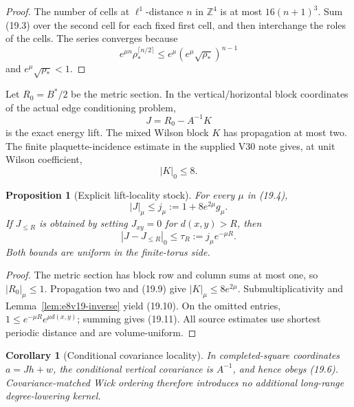 \documentclass[11pt,oneside]{book}
\newtheorem{proposition}[theorem]{Proposition}
\newtheorem{corollary}[theorem]{Corollary}
\theoremstyle{definition}
\theoremstyle{remark}
\begin{document}
\begin{proof}
The number of cells at \(\ell^1\)-distance \(n\) in
\(\mathbb Z^4\) is at most \(16(n+1)^3\).  Sum (19.3) over the second
cell for each fixed first cell, and then interchange the roles of the
cells.  The series converges because
\[
 e^{\mu n}\rho_*^{\lceil n/2\rceil}
 \leq e^\mu\left(e^\mu\sqrt{\rho_*}\right)^{n-1}
\]
and \(e^\mu\sqrt{\rho_*}<1\).
\end{proof}

Let \(R_0=B^*/2\) be the metric section.  In the vertical/horizontal
block coordinates of the actual edge conditioning problem,
\[
                         J=R_0-A^{-1}K                              \tag{19.8}
\]
is the exact energy lift.  The mixed Wilson block \(K\) has propagation
at most two.  The finite plaquette-incidence estimate in the supplied
V30 note gives, at unit Wilson coefficient,
\[
                         |K|_0\leq8.                               \tag{19.9}
\]

\begin{proposition}[Explicit lift-locality stock]
\label{prop:e8v19-lift}
For every \(\mu\) in (19.4),
\[
\boxed{\qquad
 |J|_\mu\leq j_\mu:=1+8e^{2\mu}g_\mu.
\qquad}                                                           \tag{19.10}
\]
If \(J_{\leq R}\) is obtained by setting \(J_{xy}=0\) for
\(d(x,y)>R\), then
\[
\boxed{\qquad
 |J-J_{\leq R}|_0\leq\tau_R:=j_\mu e^{-\mu R}.
\qquad}                                                           \tag{19.11}
\]
Both bounds are uniform in the finite-torus side.
\end{proposition}

\begin{proof}
The metric section has block row and column sums at most one, so
\(|R_0|_\mu\leq1\).  Propagation two and (19.9) give
\(|K|_\mu\leq8e^{2\mu}\).  Submultiplicativity and
Lemma~\ref{lem:e8v19-inverse} yield (19.10).  On the omitted entries,
\(1\leq e^{-\mu R}e^{\mu d(x,y)}\); summing gives (19.11).
All source estimates use shortest periodic distance and are
volume-uniform.
\end{proof}

\begin{corollary}[Conditional covariance locality]
\label{cor:e8v19-covariance}
In completed-square coordinates \(a=Jh+w\), the conditional vertical
covariance is \(A^{-1}\), and hence obeys (19.6).  Covariance-matched
Wick ordering therefore introduces no additional long-range
degree-lowering kernel.
\end{corollary}
\end{document}
